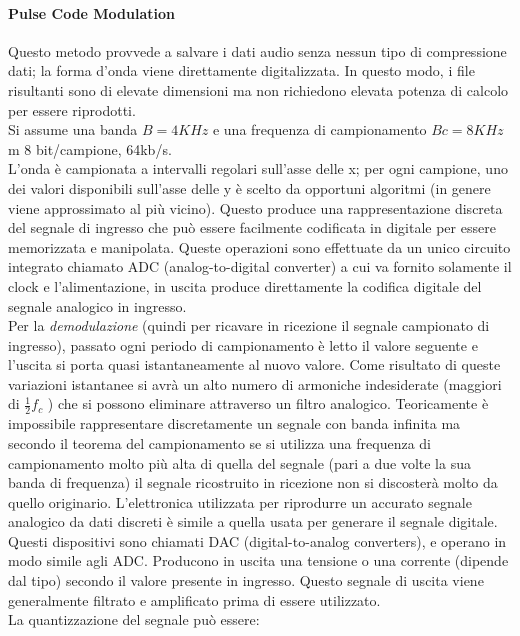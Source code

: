 \paragraph{Pulse Code Modulation}
Questo metodo provvede a salvare i dati audio senza nessun tipo di compressione dati; la forma d'onda viene direttamente digitalizzata. In questo modo, i file risultanti sono di elevate dimensioni ma non richiedono elevata potenza di calcolo per essere riprodotti.\\
Si assume una banda  $ B = 4KHz $ e una frequenza di campionamento $ Bc=8KHz $m 8 bit/campione, 64kb/s.\\
L'onda è campionata a intervalli regolari sull'asse delle x; per ogni campione, uno dei valori disponibili sull'asse delle y è scelto da opportuni algoritmi (in genere viene approssimato al più vicino). Questo produce una rappresentazione discreta del segnale di ingresso che può essere facilmente codificata in digitale per essere memorizzata e manipolata. Queste operazioni sono effettuate da un unico circuito integrato chiamato ADC (analog-to-digital converter) a cui va fornito solamente il clock e l'alimentazione, in uscita produce direttamente la codifica digitale del segnale analogico in ingresso.\\ 
Per la \textit{demodulazione} (quindi per ricavare in ricezione il segnale campionato di ingresso), passato ogni periodo di campionamento è letto il valore seguente e l'uscita si porta quasi istantaneamente al nuovo valore. Come risultato di queste variazioni istantanee si avrà un alto numero di armoniche indesiderate (maggiori di $ \frac{1}{2} f_c $ ) che si possono eliminare attraverso un filtro analogico. Teoricamente è impossibile rappresentare discretamente un segnale con banda infinita ma secondo il teorema del campionamento se si utilizza una frequenza di campionamento molto più alta di quella del segnale (pari a due volte la sua banda di frequenza) il segnale ricostruito in ricezione non si discosterà molto da quello originario. L'elettronica utilizzata per riprodurre un accurato segnale analogico da dati discreti è simile a quella usata per generare il segnale digitale. Questi dispositivi sono chiamati DAC (digital-to-analog converters), e operano in modo simile agli ADC. Producono in uscita una tensione o una corrente (dipende dal tipo) secondo il valore presente in ingresso. Questo segnale di uscita viene generalmente filtrato e amplificato prima di essere utilizzato.\\
La quantizzazione del segnale può essere:
